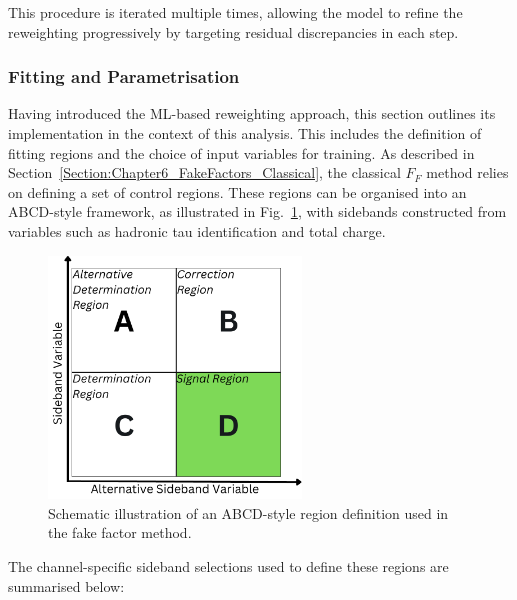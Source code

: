 This procedure is iterated multiple times, allowing the model to refine the reweighting progressively by targeting residual discrepancies in each step.

\subsubsection{Fitting and Parametrisation}
\label{Section6:Fitting_Parametrisation}
Having introduced the ML-based reweighting approach, this section outlines its implementation in the context of this analysis. This includes the definition of fitting regions and the choice of input variables for training. As described in Section~\ref{Section:Chapter6_FakeFactors_Classical}, the classical $F_F$ method relies on defining a set of control regions. These regions can be organised into an ABCD-style framework, as illustrated in Fig.~\ref{Figure:Chapter6_ABCD}, with sidebands constructed from variables such as hadronic tau identification and total charge.

\begin{figure}[!htbp]
\centering
\includegraphics[width=0.6\textwidth]{Figures/Chapter6/ABCD.pdf}
\caption[ABCD-style region definition for fake factor estimation.]{Schematic illustration of an ABCD-style region definition used in the fake factor method.}
\label{Figure:Chapter6_ABCD}
\end{figure}

The channel-specific sideband selections used to define these regions are summarised below:

